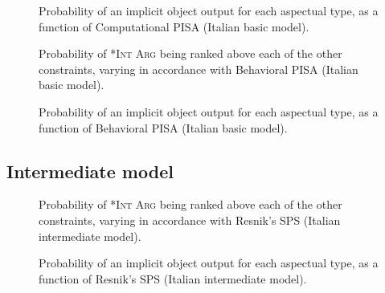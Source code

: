 \begin{figure}[htb]
\caption{Probability of an implicit object output for each aspectual type, as a function of Computational PISA (Italian basic model).}
    
\end{figure}



\begin{figure}[htb]
\caption{Probability of \textsc{*Int Arg} being ranked above each of the other constraints, varying in accordance with Behavioral PISA (Italian basic model).}
    
\end{figure}

\begin{figure}[htb]
\caption{Probability of an implicit object output for each aspectual type, as a function of Behavioral PISA (Italian basic model).}
    
\end{figure}




\subsection{Intermediate model} 


\begin{figure}[htb]
\caption{Probability of \textsc{*Int Arg} being ranked above each of the other constraints, varying in accordance with Resnik's SPS (Italian intermediate model).}
    
\end{figure}

\begin{figure}[htb]
\caption{Probability of an implicit object output for each aspectual type, as a function of Resnik's SPS (Italian intermediate model).}
    
\end{figure}


